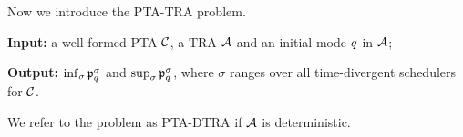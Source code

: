 

Now we introduce the {\sc PTA-TRA} problem.

\begin{compactitem}
\item {\bf Input:} a well-formed PTA $\mathcal{C}$, a TRA  $\mathcal{A}$ and an initial mode $q$ in $\mathcal{A}$;
\item {\bf Output:} $\inf_\sigma \mathfrak{p}_{q}^{\sigma}$ and $\sup_\sigma  \mathfrak{p}_{q}^{\sigma}$, where $\sigma$ ranges over all time-divergent schedulers for $\mathcal{C}$.
\end{compactitem}

We refer to the problem as {\sc PTA-DTRA} if $\mathcal{A}$ is deterministic.


